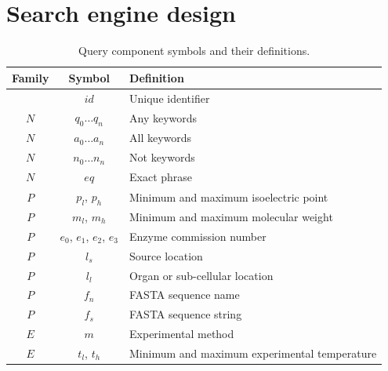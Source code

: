 

\section{Search engine design}

\begin{table}[H]
\centering
\begin{tabular}{| c | c | l |}
\hline
\textbf{Family} & \textbf{Symbol} & \textbf{Definition}\\
\hline
& $id$ & Unique identifier\\
$N$ & $q_0 \ldots q_n$ & Any keywords\\
$N$ & $a_0 \ldots a_n$ & All keywords\\
$N$ & $n_0 \ldots n_n$ & Not keywords\\
$N$ & $eq$ & Exact phrase\\
$P$ & $p_l$, $p_h$ & Minimum and maximum isoelectric point\\
$P$ & $m_l$, $m_h$ & Minimum and maximum molecular weight\\
$P$ & $e_0$, $e_1$, $e_2$, $e_3$ & Enzyme commission number\\
$P$ & $l_s$ & Source location\\
$P$ & $l_l$ & Organ or sub-cellular location\\
$P$ & $f_n$ & FASTA sequence name\\
$P$ & $f_s$ & FASTA sequence string\\
$E$ & $m$ & Experimental method\\
$E$ & $t_l$, $t_h$ & Minimum and maximum experimental temperature\\
\hline
\end{tabular}
\caption[Query component symbols and their definitions]{Query component symbols and their definitions.}
\label{tab:query-components}
\end{table}



\newpage

